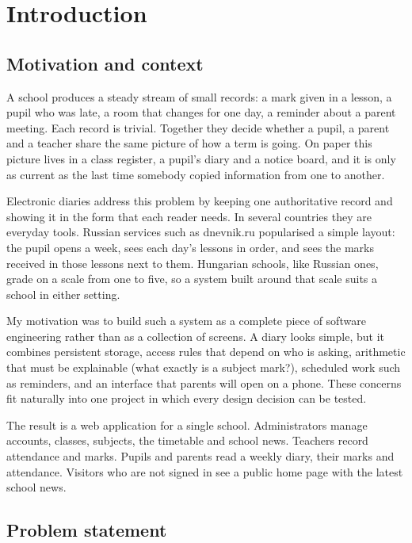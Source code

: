 \chapter{Introduction}

\section{Motivation and context}

A school produces a steady stream of small records: a mark given in a lesson, a pupil who was late, a room that changes for one day, a reminder about a parent meeting. Each record is trivial. Together they decide whether a pupil, a parent and a teacher share the same picture of how a term is going. On paper this picture lives in a class register, a pupil's diary and a notice board, and it is only as current as the last time somebody copied information from one to another.

Electronic diaries address this problem by keeping one authoritative record and showing it in the form that each reader needs. In several countries they are everyday tools. Russian services such as dnevnik.ru popularised a simple layout: the pupil opens a week, sees each day's lessons in order, and sees the marks received in those lessons next to them. Hungarian schools, like Russian ones, grade on a scale from one to five, so a system built around that scale suits a school in either setting.

My motivation was to build such a system as a complete piece of software engineering rather than as a collection of screens. A diary looks simple, but it combines persistent storage, access rules that depend on who is asking, arithmetic that must be explainable (what exactly is a subject mark?), scheduled work such as reminders, and an interface that parents will open on a phone. These concerns fit naturally into one project in which every design decision can be tested.

The result is a web application for a single school. Administrators manage accounts, classes, subjects, the timetable and school news. Teachers record attendance and marks. Pupils and parents read a weekly diary, their marks and attendance. Visitors who are not signed in see a public home page with the latest school news.

\section{Problem statement}

